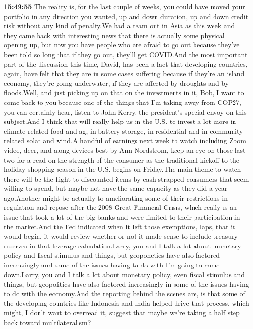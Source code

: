 \documentclass{article}%
\begin{document}
\textbf{15:49:55}%
\newline%
The reality is, for the last couple of weeks, you could have moved your portfolio in any direction you wanted, up and down duration, up and down credit risk without any kind of penalty.We had a team out in Asia as this week and they came back with interesting news that there is actually some physical opening up, but now you have people who are afraid to go out because they've been told so long that if they go out, they'll get COVID.And the most important part of the discussion this time, David, has been a fact that developing countries, again, have felt that they are in some cases suffering because if they're an island economy, they're going underwater, if they are affected by droughts and by floods.Well, and just picking up on that on the investments in it, Bob, I want to come back to you because one of the things that I'm taking away from COP27, you can certainly hear, listen to John Kerry, the president's special envoy on this subject.And I think that will really help us in the U.S. to invest a lot more in climate{-}related food and ag, in battery storage, in residential and in community{-}related solar and wind.A handful of earnings next week to watch including Zoom video, deer, and along devices best by Ann Nordstrom, keep an eye on those last two for a read on the strength of the consumer as the traditional kickoff to the holiday shopping season in the U.S. begins on Friday.The main theme to watch there will be the flight to discounted items by cash{-}strapped consumers that seem willing to spend, but maybe not have the same capacity as they did a year ago.Another might be actually to ameliorating some of their restrictions in regulation and repose after the 2008 Great Financial Crisis, which really is an issue that took a lot of the big banks and were limited to their participation in the market.And the Fed indicated when it left those exemptions, laps, that it would begin, it would review whether or not it made sense to include treasury reserves in that leverage calculation.Larry, you and I talk a lot about monetary policy and fiscal stimulus and things, but geoponetics have also factored increasingly and some of the issues having to do with  I'm going to come down.Larry, you and I talk a lot about monetary policy, even fiscal stimulus and things, but geopolitics have also factored increasingly in some of the issues having to do with the economy.And the reporting behind the scenes are, is that some of the developing countries like Indonesia and India helped drive that process, which might, I don't want to overread it, suggest that maybe we're taking a half step back toward multilateralism?%
\end{document}
